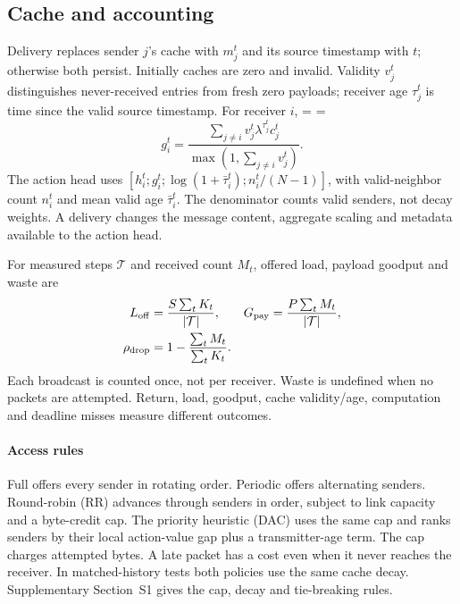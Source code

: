 \documentclass[a4paper,fleqn]{cas-dc}
\begin{document}
\subsection{Cache and accounting}
Delivery replaces sender $j$'s cache with $m_j^t$ and its source timestamp with $t$; otherwise both persist. Initially caches are zero and invalid. Validity $v_j^t$ distinguishes never-received entries from fresh zero payloads; receiver age $\tau_j^t$ is time since the valid source timestamp. For receiver $i$,
\begingroup
\makeatletter\@fleqnfalse\makeatother
\abovedisplayshortskip=\abovedisplayskip
\belowdisplayshortskip=\belowdisplayskip
\begin{equation}
 g_i^t=\frac{\sum_{j\ne i}v_j^t\lambda^{\tau_j^t}c_j^t}{\max(1,\sum_{j\ne i}v_j^t)}.
\end{equation}
\endgroup
The action head uses $[h_i^t;g_i^t;\log(1+\bar\tau_i^t);n_i^t/(N-1)]$, with valid-neighbor count $n_i^t$ and mean valid age $\bar\tau_i^t$. The denominator counts valid senders, not decay weights. A delivery changes the message content, aggregate scaling and metadata available to the action head.

For measured steps $\mathcal T$ and received count $M_t$, offered load, payload goodput and waste are
\begin{equation}
\begin{aligned} L_{\rm off}&=\frac{S\sum_tK_t}{|\mathcal T|}, &G_{\rm pay}&=\frac{P\sum_tM_t}{|\mathcal T|},\\ \rho_{\rm drop}&=1-\frac{\sum_tM_t}{\sum_tK_t}.\end{aligned}
\end{equation}
Each broadcast is counted once, not per receiver. Waste is undefined when no packets are attempted. Return, load, goodput, cache validity/age, computation and deadline misses measure different outcomes.
\paragraph{Access rules}
Full offers every sender in rotating order. Periodic offers alternating senders. Round-robin (RR) advances through senders in order, subject to link capacity and a byte-credit cap. The priority heuristic (DAC) uses the same cap and ranks senders by their local action-value gap plus a transmitter-age term. The cap charges attempted bytes. A late packet has a cost even when it never reaches the receiver. In matched-history tests both policies use the same cache decay. Supplementary Section~S1 gives the cap, decay and tie-breaking rules.
\end{document}
